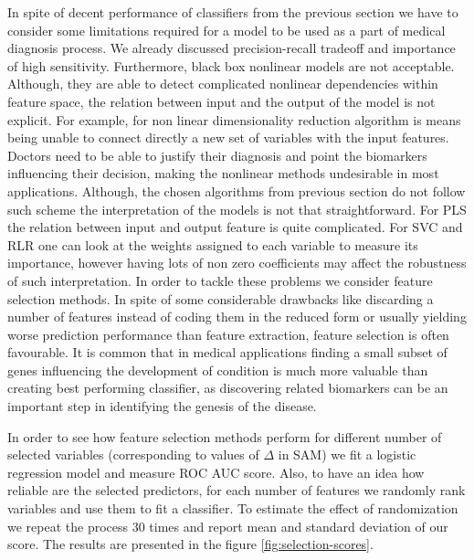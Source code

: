 \documentclass[shortabstract, english, mgr]{iithesis}
\begin{document}
In spite of decent performance of classifiers from the previous section we have to consider some limitations required for a model to be used as a part of medical diagnosis process. We already discussed precision-recall tradeoff and importance of high sensitivity. Furthermore, black box nonlinear models are not acceptable. Although, they are able to detect complicated nonlinear dependencies within feature space, the relation between input and the output of the model is not explicit. For example, for non linear dimensionality reduction algorithm is means being unable to connect directly a new set of variables with the input features. Doctors need to be able to justify their diagnosis and point the biomarkers influencing their decision, making the nonlinear methods undesirable in most applications. Although, the chosen algorithms from previous section do not follow such scheme the interpretation of the models is not that straightforward. For PLS the relation between input and output feature is quite complicated. For SVC and RLR one can look at the weights assigned to each variable to measure its importance, however having lots of non zero coefficients may affect the robustness of such interpretation. In order to tackle these problems we consider feature selection methods. In spite of some considerable drawbacks like discarding a number of features instead of coding them in the reduced form or usually yielding worse prediction performance than feature extraction, feature selection is often favourable. It is common that in medical applications finding a small subset of genes influencing the development of condition is much more valuable than creating best performing classifier, as discovering related biomarkers can be an important step in identifying the genesis of the disease.

In order to see how feature selection methods perform for different number of selected variables (corresponding to values of $\Delta$ in SAM) we fit a logistic regression model and measure ROC AUC score. Also, to have an idea how reliable are the selected predictors, for each number of features we randomly rank variables and use them to fit a classifier. To estimate the effect of randomization we repeat the process $30$ times and report mean and standard deviation of our score. The results are presented in the figure \ref{fig:selection-scores}.
\end{document}
